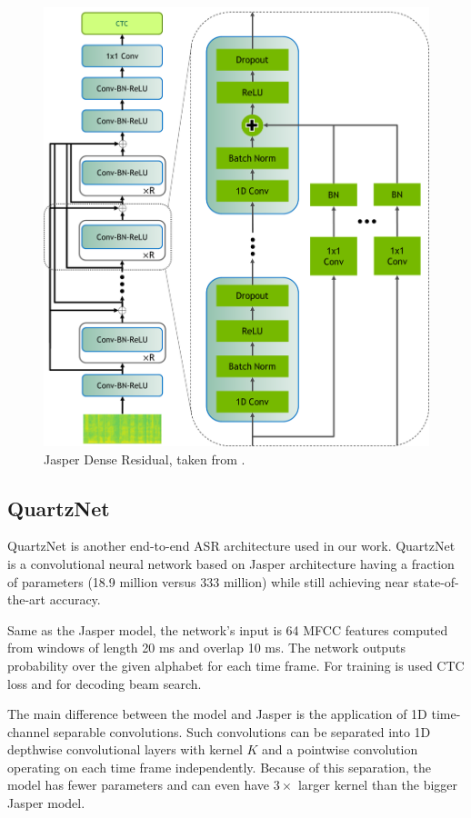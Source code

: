 \begin{figure}[h]
	\centering
	\includegraphics[scale=0.7]{img/JasperVerticalDR4.png}
	\caption{Jasper Dense Residual, taken from .}
	\label{fig:jasper_dr}
\end{figure}

\subsection{QuartzNet}

QuartzNet  is another end-to-end ASR architecture used in our work. QuartzNet is a convolutional neural network based on Jasper  architecture having a fraction of parameters (18.9 million versus 333 million) while still achieving near state-of-the-art accuracy.

Same as the Jasper model, the network's input is 64 MFCC features computed from windows of length 20 ms and overlap 10 ms. The network outputs probability over the given alphabet for each time frame. For training is used CTC loss and for decoding beam search.

The main difference between the model and Jasper is the application of 1D time-channel separable convolutions.  Such convolutions can be separated into 1D depthwise convolutional layers with kernel $K$ and a pointwise convolution operating on each time frame independently. Because of this separation, the model has fewer parameters and can even have $3 \times$ larger kernel than the bigger Jasper model.

